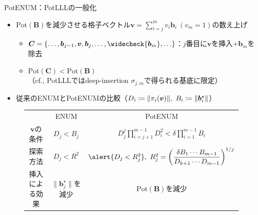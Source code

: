 \documentclass[12pt,aspectratio=169,xcolor=dvipsnames,table,dvipdfmx, leqno]{beamer}
\newcommand{\bhline}{\noalign{\hrule height 1.0pt}}
\begin{document}
\begin{frame}{PotENUM：PotLLLの一般化}
\begin{itemize}
\item $\mathrm{Pot}(\bm{B})$を減少させる格子ベクトル$\bm{v} = \sum_{i=j}^m v_i \bm{b}_i~(v_m = 1)$の数え上げ
    \begin{itemize}
    \item $\bm{C} = \{\ldots, \bm{b}_{j-1}, \bm{v}, \bm{b}_j,\ldots, \widecheck{\bm{b}_m}, \ldots \}$：$j$番目に$\bm{v}$を挿入+$\bm{b}_m$を除去
    \item $\mathrm{Pot}(\bm{C}) < \mathrm{Pot}(\bm{B})$ \\
    （cf., PotLLL\cite{FSW14}ではdeep-insertion $\sigma_{j, m}$で得られる基底に限定）
    \end{itemize}
\item 従来のENUM\cite{GNR10}とPotENUMの比較（$D_i\coloneq \norm{\pi_i(\bm{v})},~B_i\coloneq\norm{\bm{b}_i^\star}$）
\end{itemize}
\begin{figure}[htbp]
    \begin{table}[]
        \centering
        \begin{tabular}{c|c|c}
             & ENUM\cite{GNR10} & PotENUM\\
            \bhline
            $\bm{v}$の条件 & $D_j<B_j$ &\alert{$\displaystyle D_j^j \prod_{i=j+1}^{m-1}D_i^2<\delta\prod_{i=1}^{m-1}B_i$}\\
            \hline
            探索方法 & $D_j<R^2$ & $\alert{D_j<R_j^2},~R_j^2=\qty(\dfrac{\delta B_1\cdots B_{m-1}}{D_{k+1}\cdots D_{m-1}})^{1/j}$\\
            \hline
            挿入による効果 & $\| \bm{b}_j^\star \|$を減少 & \alert{$\mathrm{Pot}(\bm{B})$を減少} 
        \end{tabular}
        \label{tab:my_label}
    \end{table}


\end{figure}
\end{frame}
\end{document}
